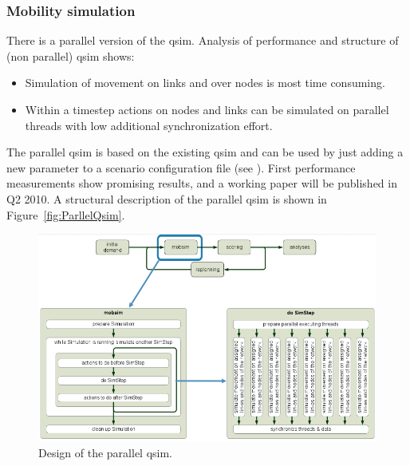 \subsubsection{Mobility simulation}\label{sec:ParallelQsim}

There is a parallel version of the qsim. Analysis of performance and structure of (non parallel) qsim shows:
\begin{itemize}
\item Simulation of movement on links and over nodes is most time consuming.
\item Within a timestep actions on nodes and links can be simulated on parallel threads with low additional synchronization effort.
\end{itemize}

The parallel qsim is based on the existing qsim and can be used by just adding a new parameter to a scenario configuration file (see ). First performance measurements show promising results, and a working paper will be published in Q2 2010. A structural description of the parallel qsim is shown in Figure~\ref{fig:ParllelQsim}.
\begin{figure}[htp]
\includegraphics[width=\textwidth]{figures/qsimParallel/parallelqsim.png}
\caption{Design of the parallel qsim.}\label{fig:ParallelQsim}
\end{figure}

